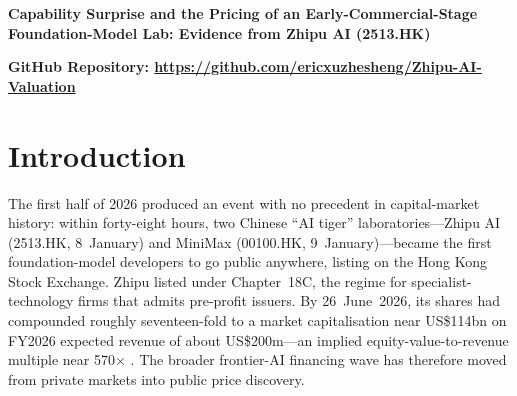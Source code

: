 \documentclass[11pt]{article}
\newcommand{\papertitle}{Capability Surprise and the Pricing of an Early-Commercial-Stage
Foundation-Model Lab: Evidence from Zhipu AI (2513.HK)}
\begin{document}
\begin{center}
{\bfseries\large \papertitle\par}
\vspace{0.35em}
{\bfseries GitHub Repository: \href{https://github.com/ericxuzhesheng/Zhipu-AI-Valuation}{https://github.com/ericxuzhesheng/Zhipu-AI-Valuation}\par}
\end{center}
\vspace{0.5em}

\begin{abstract}
\noindent In January 2026, Zhipu AI (Knowledge Atlas Technology, 2513.HK) became the first foundation-model
laboratory to list publicly anywhere, under Hong Kong's Chapter~18C listing regime. By 26~June~2026, its shares
had risen about seventeen-fold to a market capitalisation near US\$114bn---an equity value roughly 570 times its
$\sim$US\$200m of expected 2026 revenue---despite deep losses, negative book equity and cloud-deployment
margin pressure. We ask what such a firm is worth and how its price forms. A three-scenario DCF, a reverse DCF, a
comparables check and a real-options reading place fundamental value at only HK\$12--82 per share (about
1.6\% of the market price); the price instead embeds a winner-take-all outcome of more than US\$100bn revenue
by 2035. Because conventional earnings-surprise measures are economically uninformative for a deeply
loss-making early-stage lab, we replace them with \emph{capability-surprise} events (model releases and
benchmark jumps). The market prices capability quickly and discriminately---separating Zhipu from peers on
model quality, not sector---with case-study evidence consistent with post-capability-announcement drift. The valuation gap
is best read as capability momentum priced as an option, not a simple bubble.

\vspace{0.6em}
\noindent\textbf{Keywords:} foundation models; Chapter 18C; pre-profit valuation; real options; market
efficiency; capability surprise; PEAD/PCAD.
\end{abstract}

\section{Introduction}
The first half of 2026 produced an event with no precedent in capital-market history: within forty-eight
hours, two Chinese ``AI tiger'' laboratories---Zhipu AI (2513.HK, 8~January) and MiniMax (00100.HK,
9~January)---became the first foundation-model developers to go public anywhere, listing on the Hong Kong
Stock Exchange. Zhipu listed under Chapter~18C, the regime for specialist-technology firms that admits
pre-profit issuers. By 26~June~2026, its shares had compounded roughly seventeen-fold to a market
capitalisation near US\$114bn on FY2026 expected revenue of about US\$200m---an implied equity-value-to-revenue
multiple near 570$\times$ \citep{tushare2026,prospectus2513,prospectus100}. The broader frontier-AI financing wave has
therefore moved from private markets into public price discovery.
\end{document}
